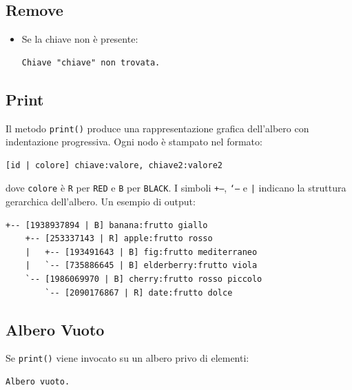 \subsection{Remove}

\begin{itemize}
    \item Se la chiave non è presente:
\begin{lstlisting}
Chiave "chiave" non trovata.
\end{lstlisting}
\end{itemize}

\subsection{Print}

Il metodo \texttt{print()} produce una rappresentazione grafica dell'albero 
con indentazione progressiva. Ogni nodo è stampato nel formato:

\begin{lstlisting}
[id | colore] chiave:valore, chiave2:valore2
\end{lstlisting}

dove \texttt{colore} è \texttt{R} per \texttt{RED} e \texttt{B} per 
\texttt{BLACK}. I simboli \texttt{+--}, \texttt{`--} e \texttt{|} 
indicano la struttura gerarchica dell'albero. Un esempio di output:

\begin{lstlisting}
+-- [1938937894 | B] banana:frutto giallo
    +-- [253337143 | R] apple:frutto rosso
    |   +-- [193491643 | B] fig:frutto mediterraneo
    |   `-- [735886645 | B] elderberry:frutto viola
    `-- [1986069970 | B] cherry:frutto rosso piccolo
        `-- [2090176867 | R] date:frutto dolce
\end{lstlisting}

\subsection{Albero Vuoto}

Se \texttt{print()} viene invocato su un albero privo di elementi:

\begin{lstlisting}
Albero vuoto.
\end{lstlisting}